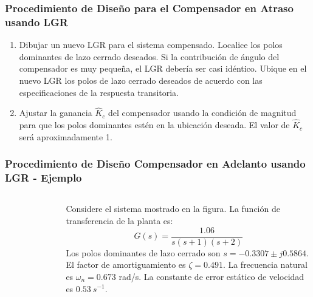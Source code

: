 \documentclass[aspectratio=169,handout]{beamer}
\theoremstyle{definition}
\theoremstyle{plain}
\theoremstyle{remark}
\newcounter{saveenumi}
\newcommand{\conti}{\setcounter{enumi}{\value{saveenumi}}}
\begin{document}
\begin{frame}[<+->]\frametitle{Procedimiento de Diseño para el Compensador en Atraso usando LGR}
	\begin{enumerate}
		\conti
		\item Dibujar un nuevo LGR para el sistema compensado. Localice los polos dominantes de lazo cerrado deseados. Si la contribución de ángulo del compensador es muy pequeña, el LGR debería ser casi idéntico. Ubique en el nuevo LGR los polos de lazo cerrado deseados de acuerdo con las especificaciones de la respuesta transitoria.
		\item Ajustar la ganancia $\hat{K}_c$ del compensador usando la condición de magnitud para que los polos dominantes estén en la ubicación deseada. El valor de $\hat{K}_c$ será aproximadamente 1.
	\end{enumerate}
\end{frame}


\begin{frame}[c]\frametitle{Procedimiento de Diseño Compensador en Adelanto usando LGR - Ejemplo}
\begin{columns}
	\begin{column}{0.4\textwidth}
		\begin{figure}
			\includegraphics[width=4.5cm]{images/ejemplo2_planta.eps}
		\end{figure}
	\end{column}
	\begin{column}{0.6\textwidth}
		Considere el sistema mostrado en la figura. La función de transferencia de la planta es:
		\begin{equation*}
			G(s) = \frac{1.06}{s(s+1)(s+2)}
		\end{equation*}
		\pause	
		Los polos dominantes de lazo cerrado son $s = -0.3307 \pm j0.5864$. El factor de amortiguamiento es $\zeta = 0.491$. La frecuencia natural es $\omega_n = 0.673$ rad/s. La constante de error estático de velocidad es $0.53\ s^{-1}$.
	\end{column}
\end{columns}
\end{frame}
\end{document}
